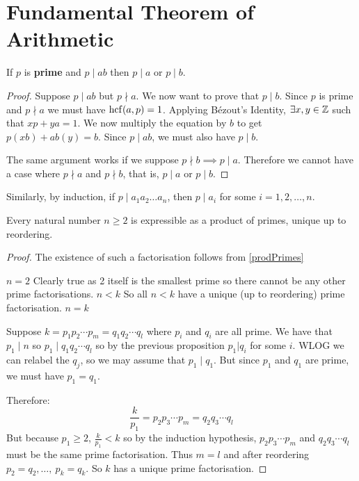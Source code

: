 \documentclass[../main.tex]{subfiles}
\begin{document}
\section{Fundamental Theorem of Arithmetic}
\begin{proposition}
  If $p$ is \textbf{prime} and $p \mid ab$ then $p \mid a$ or $p \mid b$.
  \label{euclidsLemma}
\end{proposition}
\begin{proof}
  Suppose $p \mid ab$ but $p \nmid a$. We now want to prove that $p \mid b$.
  Since $p$ is prime and $p \nmid a$ we must have $\operatorname{hcf}(a, p) = 1$.
  Applying B\'ezout's Identity, $\exists x, y \in \mathbb{Z}$ such that $xp + ya = 1$.
  We now multiply the equation by $b$ to get $p(xb) + ab(y) = b$.
  Since $p \mid ab$, we must also have $p \mid b$.

  The same argument works if we suppose $p \nmid b \implies p \mid a$.
  Therefore we cannot have a case where $p \nmid a$ and $p \nmid b$, that is, $p \mid a$ or $p \mid b$.
\end{proof}
\begin{remark}
  Similarly, by induction, if $p \mid a_1 a_2 \ldots a_n$, then $p \mid a_i$  for some $i = 1, 2, \ldots, n$.
\end{remark}
\begin{theorem}
  Every natural number $n \geq 2$ is expressible as a product of primes, unique up to reordering. \label{uniquePrimeFactorisation}
\end{theorem}
\begin{proof}
  The existence of such a factorisation follows from \cref{prodPrimes}\par
  \quietinduction
  {$n = 2$}{
    Clearly true as 2 itself is the smallest prime so there cannot be any other prime factorisations.
  }
  {$n < k$}{
    So all $n < k$ have a unique (up to reordering) prime factorisation.
  }
  {$n = k$}{
    Suppose $k = p_1 p_2 \cdots p_m = q_1 q_2 \cdots q_l$ where $p_i$ and $q_i$ are all prime.
    We have that $p_1 \mid n$ so $p_1 \mid q_1 q_2 \cdots q_l$ so by the previous proposition $p_1 | q_i$ for some $i$.
    WLOG we can relabel the $q_j$, so we may assume that $p_1 \mid q_1$.
    But since $p_1$ and $q_1$ are prime, we must have $p_1 = q_1$.

    Therefore:
    \[
      \frac{k}{p_1} = p_2 p_3\cdots p_m = q_2 q_3 \cdots q_l
    \]
    But because $p_1 \geq 2$, $\frac{k}{p_1} < k$ so by the induction hypothesis, $p_2 p_3 \cdots p_m$ and $q_2 q_3 \cdots q_l$ must be the same prime factorisation.
    Thus $m=l$ and after reordering $p_2 = q_2, \ldots,\ p_k = q_k$.
    So $k$ has a unique prime factorisation.
  }
\end{proof}
\end{document}
